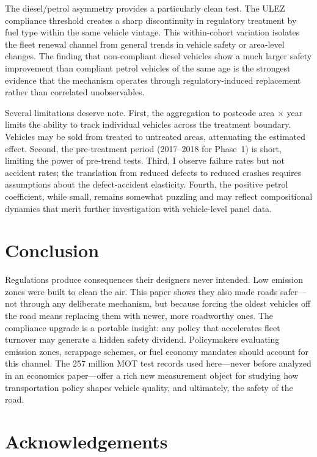 \documentclass[12pt]{article}
\begin{document}
The diesel/petrol asymmetry provides a particularly clean test. The ULEZ compliance threshold creates a sharp discontinuity in regulatory treatment by fuel type within the same vehicle vintage. This within-cohort variation isolates the fleet renewal channel from general trends in vehicle safety or area-level changes. The finding that non-compliant diesel vehicles show a much larger safety improvement than compliant petrol vehicles of the same age is the strongest evidence that the mechanism operates through regulatory-induced replacement rather than correlated unobservables.

Several limitations deserve note. First, the aggregation to postcode area $\times$ year limits the ability to track individual vehicles across the treatment boundary. Vehicles may be sold from treated to untreated areas, attenuating the estimated effect. Second, the pre-treatment period (2017--2018 for Phase~1) is short, limiting the power of pre-trend tests. Third, I observe failure rates but not accident rates; the translation from reduced defects to reduced crashes requires assumptions about the defect-accident elasticity. Fourth, the positive petrol coefficient, while small, remains somewhat puzzling and may reflect compositional dynamics that merit further investigation with vehicle-level panel data.


\section{Conclusion}

Regulations produce consequences their designers never intended. Low emission zones were built to clean the air. This paper shows they also made roads safer---not through any deliberate mechanism, but because forcing the oldest vehicles off the road means replacing them with newer, more roadworthy ones. The compliance upgrade is a portable insight: any policy that accelerates fleet turnover may generate a hidden safety dividend. Policymakers evaluating emission zones, scrappage schemes, or fuel economy mandates should account for this channel. The 257 million MOT test records used here---never before analyzed in an economics paper---offer a rich new measurement object for studying how transportation policy shapes vehicle quality, and ultimately, the safety of the road.

\section*{Acknowledgements}
\end{document}
